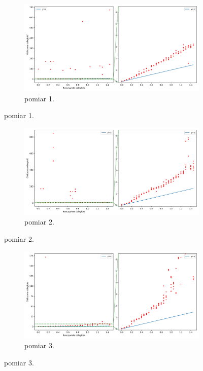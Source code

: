\begin{figure}[H]
    \centering
    \begin{subfigure}{\textwidth}
        \centering
        \includegraphics[width=\textwidth]{pics/mic_sync_dist/dists_long_0.png}
        \caption{pomiar 1.}
        \label{pic:slope_test_0}
    \end{subfigure}
\end{figure}
\begin{figure}[H]
    \ContinuedFloat\centering
    \begin{subfigure}{\textwidth}
        \centering
        \includegraphics[width=\textwidth]{pics/mic_sync_dist/dists_long_1.png}
        \caption{pomiar 2.}
        \label{pic:slope_test_1}
    \end{subfigure}
\end{figure}
\begin{figure}[H]
    \ContinuedFloat\centering
    \begin{subfigure}{\textwidth}
        \centering
        \includegraphics[width=\textwidth]{pics/mic_sync_dist/dists_long_2.png}
        \caption{pomiar 3.}
        \label{pic:slope_test_2}
    \end{subfigure}
\end{figure}

